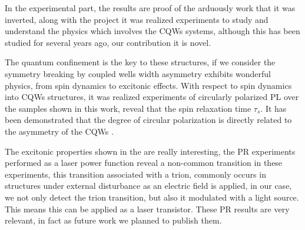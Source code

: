 In the experimental part, the results are proof of the arduously work that it was inverted, along with the project it was realized experiments to study and understand the physics which involves the \gls{CQWs} systems, although this has been studied for several years ago, our contribution it is novel.

The quantum confinement is the key to these structures, if we consider the symmetry breaking by coupled wells width asymmetry exhibits wonderful physics, from spin dynamics to excitonic effects. With respect to spin dynamics into \gls{CQWs} structures, it was realized
experiments of circularly polarized PL over the samples shown in this work, reveal that the
spin relaxation time $\tau_s$. It has been demonstrated that the degree of circular polarization is directly related to the asymmetry of the \gls{CQWs} \cite{bravo2022photoluminiscence}.

The excitonic properties shown in the  are really interesting, the \gls{PR}
experiments performed as a laser power function reveal a non-common transition in these experiments, this transition associated with a trion, commonly occurs in structures under external disturbance as an electric field is applied, in our case, we not only detect the trion transition, but also it modulated with a light source. This means this can be applied as a laser transistor. These \gls{PR} results are very relevant, in fact as future work we planned
to publish them.

